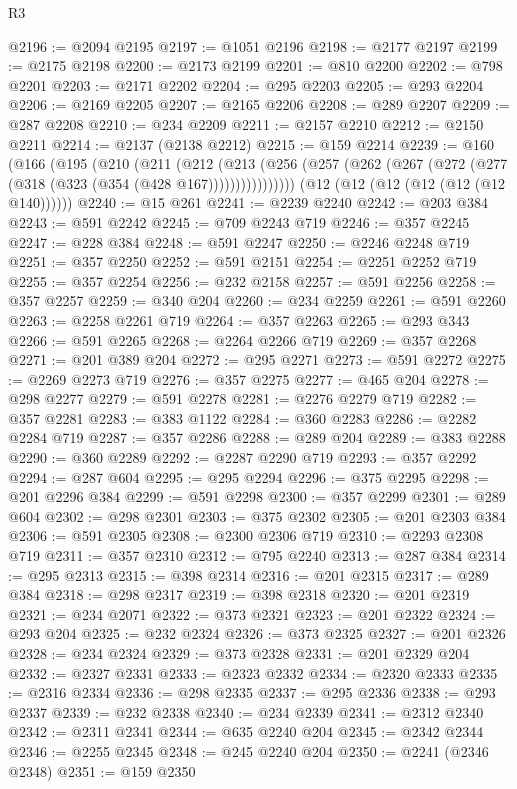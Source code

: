 \begin{lexlean}{R3}
\begin{coremodule}
@2196 := @2094 @2195
@2197 := @1051 @2196
@2198 := @2177 @2197
@2199 := @2175 @2198
@2200 := @2173 @2199
@2201 := @810 @2200
@2202 := @798 @2201
@2203 := @2171 @2202
@2204 := @295 @2203
@2205 := @293 @2204
@2206 := @2169 @2205
@2207 := @2165 @2206
@2208 := @289 @2207
@2209 := @287 @2208
@2210 := @234 @2209
@2211 := @2157 @2210
@2212 := @2150 @2211
@2214 := @2137 (@2138 @2212)
@2215 := @159 @2214
@2239 := @160
    (@166
      (@195
        (@210
          (@211
            (@212
              (@213 (@256 (@257 (@262 (@267 (@272 (@277 (@318 (@323 (@354 (@428 @167))))))))))))))))
    (@12 (@12 (@12 (@12 (@12 (@12 @140))))))
@2240 := @15 @261
@2241 := @2239 @2240
@2242 := @203 @384
@2243 := @591 @2242
@2245 := @709 @2243 @719
@2246 := @357 @2245
@2247 := @228 @384
@2248 := @591 @2247
@2250 := @2246 @2248 @719
@2251 := @357 @2250
@2252 := @591 @2151
@2254 := @2251 @2252 @719
@2255 := @357 @2254
@2256 := @232 @2158
@2257 := @591 @2256
@2258 := @357 @2257
@2259 := @340 @204
@2260 := @234 @2259
@2261 := @591 @2260
@2263 := @2258 @2261 @719
@2264 := @357 @2263
@2265 := @293 @343
@2266 := @591 @2265
@2268 := @2264 @2266 @719
@2269 := @357 @2268
@2271 := @201 @389 @204
@2272 := @295 @2271
@2273 := @591 @2272
@2275 := @2269 @2273 @719
@2276 := @357 @2275
@2277 := @465 @204
@2278 := @298 @2277
@2279 := @591 @2278
@2281 := @2276 @2279 @719
@2282 := @357 @2281
@2283 := @383 @1122
@2284 := @360 @2283
@2286 := @2282 @2284 @719
@2287 := @357 @2286
@2288 := @289 @204
@2289 := @383 @2288
@2290 := @360 @2289
@2292 := @2287 @2290 @719
@2293 := @357 @2292
@2294 := @287 @604
@2295 := @295 @2294
@2296 := @375 @2295
@2298 := @201 @2296 @384
@2299 := @591 @2298
@2300 := @357 @2299
@2301 := @289 @604
@2302 := @298 @2301
@2303 := @375 @2302
@2305 := @201 @2303 @384
@2306 := @591 @2305
@2308 := @2300 @2306 @719
@2310 := @2293 @2308 @719
@2311 := @357 @2310
@2312 := @795 @2240
@2313 := @287 @384
@2314 := @295 @2313
@2315 := @398 @2314
@2316 := @201 @2315
@2317 := @289 @384
@2318 := @298 @2317
@2319 := @398 @2318
@2320 := @201 @2319
@2321 := @234 @2071
@2322 := @373 @2321
@2323 := @201 @2322
@2324 := @293 @204
@2325 := @232 @2324
@2326 := @373 @2325
@2327 := @201 @2326
@2328 := @234 @2324
@2329 := @373 @2328
@2331 := @201 @2329 @204
@2332 := @2327 @2331
@2333 := @2323 @2332
@2334 := @2320 @2333
@2335 := @2316 @2334
@2336 := @298 @2335
@2337 := @295 @2336
@2338 := @293 @2337
@2339 := @232 @2338
@2340 := @234 @2339
@2341 := @2312 @2340
@2342 := @2311 @2341
@2344 := @635 @2240 @204
@2345 := @2342 @2344
@2346 := @2255 @2345
@2348 := @245 @2240 @204
@2350 := @2241 (@2346 @2348)
@2351 := @159 @2350

\end{coremodule}
\end{lexlean}
